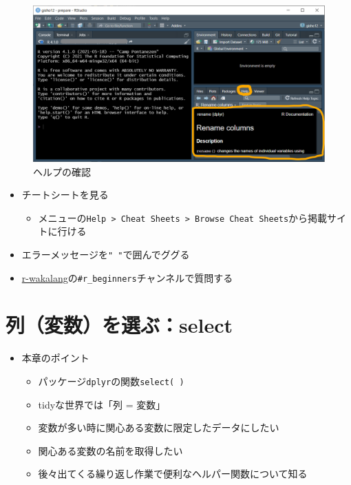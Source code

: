 \documentclass[
  xelatex,ja=standard, b5paper]{bxjsbook}
\providecommand{\tightlist}{%
  \setlength{\itemsep}{0pt}\setlength{\parskip}{0pt}}
\begin{document}
\begin{figure}

{\centering \includegraphics[width=0.8\linewidth]{images/help} 

}

\caption{ヘルプの確認}\label{fig:help}
\end{figure}

\begin{itemize}
\tightlist
\item
  チートシートを見る

  \begin{itemize}
  \tightlist
  \item
    メニューの\texttt{Help\ \textgreater{}\ Cheat\ Sheets\ \textgreater{}\ Browse\ Cheat\ Sheets}から掲載サイトに行ける
  \end{itemize}
\item
  エラーメッセージを\texttt{"\ "}で囲んでググる
\item
  \href{https://github.com/tokyor/r-wakalang}{r-wakalang}の\texttt{\#r\_beginners}チャンネルで質問する
\end{itemize}

\hypertarget{select}{%
\chapter{列（変数）を選ぶ：select}\label{select}}

\begin{itemize}
\tightlist
\item
  本章のポイント

  \begin{itemize}
  \tightlist
  \item
    パッケージ\texttt{dplyr}の関数\texttt{select(\ )}
  \item
    tidyな世界では「列 = 変数」
  \item
    変数が多い時に関心ある変数に限定したデータにしたい
  \item
    関心ある変数の名前を取得したい
  \item
    後々出てくる繰り返し作業で便利なヘルパー関数について知る
  \end{itemize}
\end{itemize}
\end{document}
